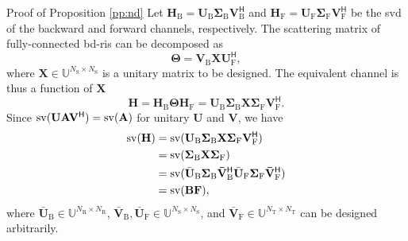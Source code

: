\documentclass[journal]{IEEEtran}
\begin{document}
\begin{appendix}
	\begin{subsection}{Proof of Proposition \ref{pp:nd}}
		\label{ap:nd}
		Let $\mathbf{H}_\mathrm{B} = \mathbf{U}_\mathrm{B} \mathbf{\Sigma}_\mathrm{B} \mathbf{V}_\mathrm{B}^\mathsf{H}$ and $\mathbf{H}_\mathrm{F} = \mathbf{U}_\mathrm{F} \mathbf{\Sigma}_\mathrm{F} \mathbf{V}_\mathrm{F}^\mathsf{H}$ be the \gls{svd} of the backward and forward channels, respectively.
		The scattering matrix of fully-connected \gls{bd}-\gls{ris} can be decomposed as
		\begin{equation}
			\label{eq:ris_decompose}
			\mathbf{\Theta} = \mathbf{V}_\mathrm{B} \mathbf{X} \mathbf{U}_\mathrm{F}^\mathsf{H},
		\end{equation}
		where $\mathbf{X} \in \mathbb{U}^{N_\mathrm{S} \times N_\mathrm{S}}$ is a unitary matrix to be designed.
		The equivalent channel is thus a function of $\mathbf{X}$
		\begin{equation}
			\label{eq:channel_nd}
			\mathbf{H} = \mathbf{H}_\mathrm{B} \mathbf{\Theta} \mathbf{H}_\mathrm{F} = \mathbf{U}_\mathrm{B} \mathbf{\Sigma}_\mathrm{B} \mathbf{X} \mathbf{\Sigma}_\mathrm{F} \mathbf{V}_\mathrm{F}^\mathsf{H}.
		\end{equation}
		Since $\operatorname{sv}(\mathbf{U} \mathbf{A} \mathbf{V}^\mathsf{H}) = \operatorname{sv}(\mathbf{A})$ for unitary $\mathbf{U}$ and $\mathbf{V}$, we have
		\begin{equation}
			\label{eq:sv_factor}
			\begin{split}
				\operatorname{sv}(\mathbf{H}) & = \operatorname{sv}(\mathbf{U}_\mathrm{B} \mathbf{\Sigma}_\mathrm{B} \mathbf{X} \mathbf{\Sigma}_\mathrm{F} \mathbf{V}_\mathrm{F}^\mathsf{H})                                                                     \\
								& = \operatorname{sv}(\mathbf{\Sigma}_\mathrm{B} \mathbf{X} \mathbf{\Sigma}_\mathrm{F})                                                                                                                            \\
								& = \operatorname{sv}(\bar{\mathbf{U}}_\mathrm{B} \mathbf{\Sigma}_\mathrm{B} \mathbf{\bar{V}}_\mathrm{B}^\mathsf{H} \bar{\mathbf{U}}_\mathrm{F} \mathbf{\Sigma}_\mathrm{F} \mathbf{\bar{V}}_\mathrm{F}^\mathsf{H}) \\
								& = \operatorname{sv}(\mathbf{BF}),
			\end{split}
		\end{equation}
		where $\bar{\mathbf{U}}_{\mathrm{B}} \in \mathbb{U}^{N_\mathrm{R} \times N_\mathrm{R}}$, $\bar{\mathbf{V}}_\mathrm{B}, \bar{\mathbf{U}}_\mathrm{F} \in \mathbb{U}^{N_\mathrm{S} \times N_\mathrm{S}}$, and $\bar{\mathbf{V}}_\mathrm{F} \in \mathbb{U}^{N_\mathrm{T} \times N_\mathrm{T}}$ can be designed arbitrarily.
	\end{subsection}


\end{appendix}
\end{document}
